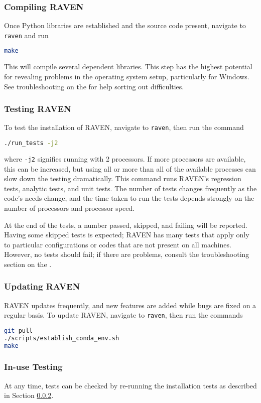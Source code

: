 \subsubsection{Compiling RAVEN}
Once Python libraries are established and the source code present, navigate to \texttt{raven} and run
\begin{lstlisting}[language=bash]
make
\end{lstlisting}
This will compile several dependent libraries.  This step has the highest potential for revealing problems in
the operating system setup, particularly for Windows.  See troubleshooting on the \wiki for help sorting out
difficulties.


\subsubsection{Testing RAVEN}
\label{sec:testing raven}
To test the installation of RAVEN, navigate to \texttt{raven}, then run the command
\begin{lstlisting}[language=bash]
./run_tests -j2
\end{lstlisting}
where \texttt{-j2} signifies running with 2 processors.  If more processors are available, this can be
increased, but using all or more than all of the available processes can slow down the testing dramatically.
This command runs RAVEN's regression tests, analytic tests, and unit tests.  The number of tests changes
frequently as the code's needs change, and the time taken to run the tests depends strongly on the number of
processors and processor speed.

At the end of the tests, a number passed, skipped, and failing will be reported.  Having some skipped tests is
expected; RAVEN has many tests that apply only to particular configurations or codes that are not present on
all machines.  However, no tests should fail; if there are problems, consult the troubleshooting section on
the \wiki.


\subsubsection{Updating RAVEN}
RAVEN updates frequently, and new features are added while bugs are fixed on a regular basis.  To update
RAVEN, navigate to \texttt{raven}, then run the commands
\begin{lstlisting}[language=bash]
git pull
./scripts/establish_conda_env.sh
make
\end{lstlisting}


\subsubsection{In-use Testing}

At any time, tests can be checked by re-running the installation tests as
described in Section \ref{sec:testing raven}.
